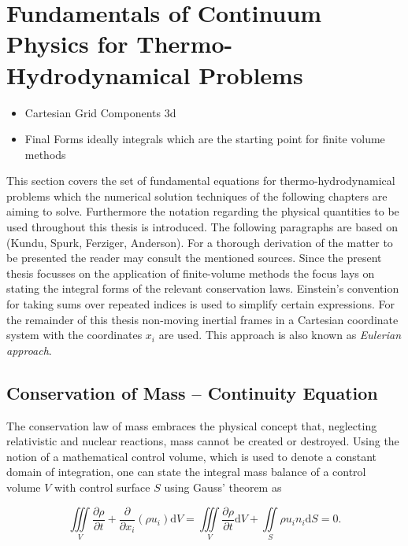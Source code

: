 
  \section{Fundamentals of Continuum Physics for Thermo-Hydrodynamical Problems}

    \begin{itemize}
        \item Cartesian Grid Components 3d
        \item Final Forms ideally integrals which are the starting point for finite volume methods
      \end{itemize}

      This section covers the set of fundamental equations for thermo-hydrodynamical problems which the numerical solution techniques of the following chapters are aiming to solve. Furthermore the notation regarding the physical quantities to be used throughout this thesis is introduced. The following paragraphs are based on (Kundu, Spurk, Ferziger, Anderson). For a thorough derivation of the matter to be presented the reader may consult the mentioned sources. Since the present thesis focusses on the application of finite-volume methods the focus lays on stating the integral forms of the relevant conservation laws. Einstein's convention for taking sums over repeated indices is used to simplify certain expressions. For the remainder of this thesis non-moving inertial frames in a Cartesian coordinate system with the coordinates \( x_i \) are used. This approach is also known as \textit{Eulerian approach}. 

    \subsection{Conservation of Mass -- Continuity Equation}

    The conservation law of mass embraces the physical concept that, neglecting relativistic and nuclear reactions, mass cannot be created or destroyed. Using the notion of a mathematical control volume, which is used to denote a constant domain of integration, one can state the integral mass balance of a control volume \(V\) with control surface \(S\) using Gauss' theorem as

    \begin{equation}
      \label{eq:contifull}
      \iiint\limits_V \frac{\partial \rho}{\partial t} + \frac{\partial}{\partial x_i}\left( \rho u_i \right) \mathrm{d}V 
      =  \iiint\limits_V \frac{\partial \rho}{\partial t} \mathrm{d}V + \iint\limits_S \rho u_i n_i \mathrm{d}S
      = 0.
    \end{equation}

